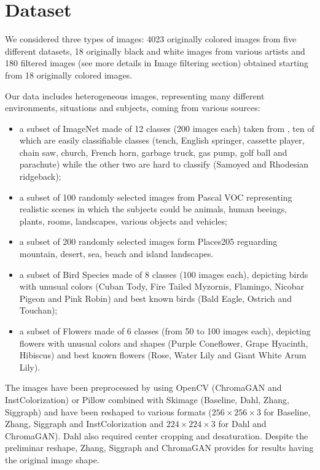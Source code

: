 \section{Dataset}
We considered three types of images: 4023 originally colored images from five different datasets, 18 originally black and white images from various artists and 180 filtered images (see more details in Image filtering section) obtained starting from 18 originally colored images.

Our data includes heterogeneous images, representing many different environments, situations and subjects, coming from various sources:
\begin{itemize}
	\item a subset of ImageNet made of 12 classes (200 images each) taken from \cite{imagenette}, ten of which are easily classifiable classes (tench, English springer, cassette player, chain saw, church, French horn, garbage truck, gas pump, golf ball and parachute) while the other two are hard to classify (Samoyed and Rhodesian ridgeback);
	\item a subset of 100 randomly selected images from Pascal VOC \cite{pascal} representing realistic scenes in which the subjects could be animals, human beeings, plants, rooms, landscapes, various objects and vehicles;
	\item a subset of 200 randomly selected images form Places205 \cite{place} reguarding mountain, desert, sea, beach and island landscapes.
	\item a subset of Bird Species \cite{bird} made of 8 classes (100 images each), depicting birds with unusual colors (Cuban Tody, Fire Tailed Myzornis, Flamingo, Nicobar Pigeon and Pink Robin) and best known birds (Bald Eagle, Ostrich and Touchan);
	\item a subset of Flowers \cite{flower} made of 6 classes (from 50 to 100 images each), depicting flowers with unusual colors and shapes (Purple Coneflower, Grape Hyacinth, Hibiscus) and best known flowers (Rose, Water Lily and Giant White Arum Lily).
\end{itemize}

The images have been preprocessed by using OpenCV (ChromaGAN and InstColorization) or Pillow combined with Skimage
(Baseline, Dahl, Zhang, Siggraph) and have been reshaped to various formats ($256\times256\times3$ for Baseline, Zhang, Siggraph and InstColorization and $224\times224\times3$ for Dahl and ChromaGAN). Dahl also required center cropping and desaturation. Despite the preliminar reshape, Zhang, Siggraph and ChromaGAN provides for results having the original image shape.

